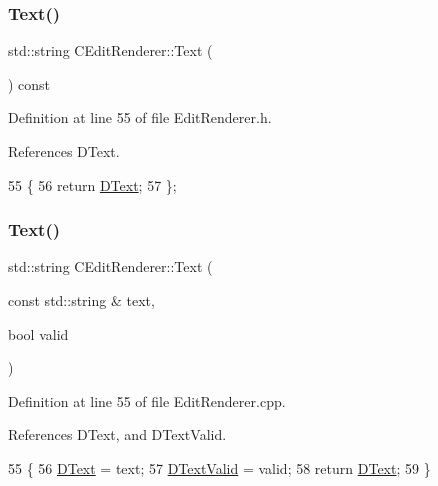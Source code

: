 \subsubsection{\texorpdfstring{Text()}{Text()}\hspace{0.1cm}{\footnotesize\ttfamily [1/2]}}
{\footnotesize\ttfamily std\+::string C\+Edit\+Renderer\+::\+Text (\begin{DoxyParamCaption}{ }\end{DoxyParamCaption}) const\hspace{0.3cm}{\ttfamily [inline]}}



Definition at line 55 of file Edit\+Renderer.\+h.



References D\+Text.


\begin{DoxyCode}
55                               \{
56             \textcolor{keywordflow}{return} \hyperlink{classCEditRenderer_af79bf047383c610d4fc24d937e29c594}{DText};   
57         \};
\end{DoxyCode}
\hypertarget{classCEditRenderer_aaf22d741a35786d3b667eca90c25d1f4}{}\label{classCEditRenderer_aaf22d741a35786d3b667eca90c25d1f4} 
\subsubsection{\texorpdfstring{Text()}{Text()}\hspace{0.1cm}{\footnotesize\ttfamily [2/2]}}
{\footnotesize\ttfamily std\+::string C\+Edit\+Renderer\+::\+Text (\begin{DoxyParamCaption}\item[{const std\+::string \&}]{text,  }\item[{bool}]{valid }\end{DoxyParamCaption})}



Definition at line 55 of file Edit\+Renderer.\+cpp.



References D\+Text, and D\+Text\+Valid.


\begin{DoxyCode}
55                                                               \{
56     \hyperlink{classCEditRenderer_af79bf047383c610d4fc24d937e29c594}{DText} = text;
57     \hyperlink{classCEditRenderer_ab4f0c6b356170adad1ad3b3e16573966}{DTextValid} = valid;
58     \textcolor{keywordflow}{return} \hyperlink{classCEditRenderer_af79bf047383c610d4fc24d937e29c594}{DText};
59 \}
\end{DoxyCode}
\hypertarget{classCEditRenderer_a9d93896dd7d4a279e8a957627679a511}{}\label{classCEditRenderer_a9d93896dd7d4a279e8a957627679a511} 
